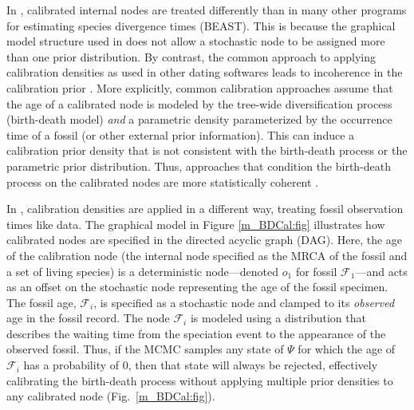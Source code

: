 In \RevBayes, calibrated internal nodes are treated differently than in many other programs for estimating species divergence times (\EG BEAST).
This is because the graphical model structure used in \RevBayes does not allow a stochastic node to be assigned more than one prior distribution. 
By contrast, the common approach to applying calibration densities as used in other dating softwares leads to incoherence in the calibration prior \citep[for detailed explainations of this see][]{Warnock2012,Heled2012,Heath2014}. 
More explicitly, common calibration approaches assume that the age of a calibrated node is modeled by the tree-wide diversification process (\EG birth-death model) \emph{and} a parametric density parameterized by the occurrence time of a fossil (or other external prior information).
This can induce a calibration prior density that is not consistent with the birth-death process or the parametric prior distribution. 
Thus, approaches that condition the birth-death process on the calibrated nodes are more statistically coherent \citep{Yang2006}.

In \RevBayes, calibration densities are applied in a different way, treating fossil observation times like data. 
The graphical model in Figure \ref{m_BDCal:fig} illustrates how calibrated nodes are specified in the directed acyclic graph (DAG).
Here, the age of the calibration node (\IE the internal node specified as the MRCA of the fossil and a set of living species) is a deterministic node---\EG denoted $o_1$ for fossil $\mathcal{F}_1$---and acts as an offset on the stochastic node representing the age of the fossil specimen.
The fossil age, $\mathcal{F}_i$, is specified as a stochastic node and clamped to its \emph{observed} age in the fossil record. 
The node $\mathcal{F}_i$ is modeled using a distribution that describes the waiting time from the speciation event to the appearance of the observed fossil. 
Thus, if the MCMC samples any state of $\Psi$ for which the age of $\mathcal{F}_i$ has a probability of 0, then that state will always be rejected, effectively calibrating the birth-death process without applying multiple prior densities to any calibrated node (Fig.~\ref{m_BDCal:fig}).



